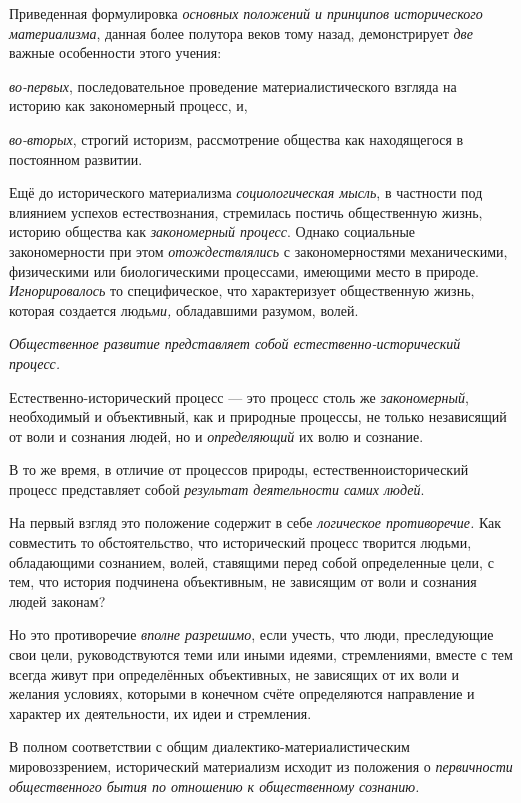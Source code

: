 \documentclass[a4paper,14pt,russian]{extreport}
\begin{document}
Приведенная формулировка \emph{основных положений и принципов исторического материализма}, данная более полутора веков тому назад, демонстрирует \emph{две} важные особенности этого учения:

\emph{во-первых}, последовательное проведение материалистического взгляда на историю как закономерный процесс, и,

\emph{во-вторых}, строгий историзм, рассмотрение общества как находящегося в постоянном развитии.

Ещё до исторического материализма \emph{социологическая мысль}, в частности под влиянием успехов естествознания, стремилась постичь общественную жизнь, историю общества как \emph{закономерный процесс}. Однако социальные закономерности при этом \emph{отождествлялись} с закономерностями механическими, физическими или биологическими процессами, имеющими место в природе. \emph{Игнорировалось} то специфическое, что характеризует общественную жизнь, которая создается людь\emph{ми,} обладавшими разумом, волей.

\emph{Общественное развитие представляет собой естественно-исторический процесс.}

Естественно-исторический процесс --- это процесс столь же \emph{закономерный}, необходимый и объективный, как и природные процессы, не только независящий от воли и сознания людей, но и \emph{определяющий} их волю и сознание.

В то же время, в отличие от процессов природы, естественноисторический процесс представляет собой \emph{результат деятельности самих людей}.

На первый взгляд это положение содержит в себе \emph{логическое противоречие.} Как совместить то обстоятельство, что исторический процесс творится людьми, обладающими сознанием, волей, ставящими перед собой определенные цели, с тем, что история подчинена объективным, не зависящим от воли и сознания людей законам?

Но это противоречие \emph{вполне разрешимо}, если учесть, что люди, преследующие свои цели, руководствуются теми или иными идеями, стремлениями, вместе с тем всегда живут при определённых объективных, не зависящих от их воли и желания условиях, которыми в конечном счёте определяются направление и характер их деятельности, их идеи и стремления.

В полном соответствии с общим диалектико-материалистическим мировоззрением, исторический материализм исходит из положения о \emph{первичности общественного бытия по отношению к общественному сознанию.}
\end{document}
